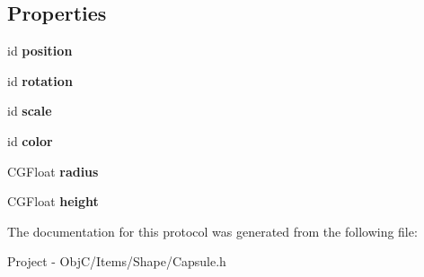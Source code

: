 \subsection*{Properties}
\begin{DoxyCompactItemize}
\item 
\hypertarget{protocol_capsule_export-p_a0fabfbe38fe8058acffdf9d83b675874}{}id {\bfseries position}\label{protocol_capsule_export-p_a0fabfbe38fe8058acffdf9d83b675874}

\item 
\hypertarget{protocol_capsule_export-p_a5c3be4fbd4877e73f8c928a6bfa81685}{}id {\bfseries rotation}\label{protocol_capsule_export-p_a5c3be4fbd4877e73f8c928a6bfa81685}

\item 
\hypertarget{protocol_capsule_export-p_a0a4a2967ed496ae42f7682565f93cf1b}{}id {\bfseries scale}\label{protocol_capsule_export-p_a0a4a2967ed496ae42f7682565f93cf1b}

\item 
\hypertarget{protocol_capsule_export-p_ad97a652201ba34122e8f43306194e8e7}{}id {\bfseries color}\label{protocol_capsule_export-p_ad97a652201ba34122e8f43306194e8e7}

\item 
\hypertarget{protocol_capsule_export-p_ac814c9354d308ffc32846446855d8d85}{}C\+G\+Float {\bfseries radius}\label{protocol_capsule_export-p_ac814c9354d308ffc32846446855d8d85}

\item 
\hypertarget{protocol_capsule_export-p_aa282cd7544404fae1354dd38c585f6d1}{}C\+G\+Float {\bfseries height}\label{protocol_capsule_export-p_aa282cd7544404fae1354dd38c585f6d1}

\end{DoxyCompactItemize}


The documentation for this protocol was generated from the following file\+:\begin{DoxyCompactItemize}
\item 
Project -\/ Obj\+C/\+Items/\+Shape/Capsule.\+h\end{DoxyCompactItemize}
